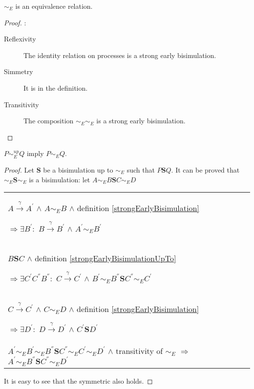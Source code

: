 \begin{proposition}
  $\sim_{E}$ is an equivalence relation.
  \begin{proof}:
    \begin{description}
      \item[Reflexivity]
	The identity relation on processes is a strong early bisimulation.
      \item[Simmetry]
	It is in the definition.
      \item[Transitivity]
	The composition $\sim_{E} \sim_{E}$ is a strong early bisimulation.
    \end{description}
  \end{proof}
\end{proposition}

\begin{proposition}\label{earlyBisimilarityUpToImplyEarlyBisimilarity}
  $P \sim_{E}^{up} Q$ imply $P \sim_{E} Q$.
  \begin{proof}
    Let $\mathbf{S}$ be a bisimulation up to $\sim_{E}$ such that $P \mathbf{S} Q$. It can be proved that $\sim_{E} \mathbf{S} \sim_{E}$ is a bisimulation: let $A \sim_{E} B \mathbf{S} C \sim_{E} D$
    \begin{center}
      \begin{tabular}{l}
	$A \xrightarrow{\gamma} A^{'}$ $\wedge$ $A \sim_{E} B$ $\wedge$ definition \ref{strongEarlyBisimulation} 
      
	$\Rightarrow \exists B^{'}:$ $B \xrightarrow{\gamma} B^{'}$ $\wedge$ $A^{'}\sim_{E} B^{'}$
      \\
	$B \mathbf{S} C$ $\wedge$ definition \ref{strongEarlyBisimulationUpTo}
      
	$\Rightarrow \exists C^{'} C^{''} B^{''}:$ $C \xrightarrow{\gamma} C^{'}$ $\wedge$ $B^{'} \sim_{E} B^{''} \mathbf{S} C^{''} \sim_{E} C^{'}$
      \\
	$C \xrightarrow{\gamma} C^{'}$ $\wedge$ $C \sim_{E} D$ $\wedge$ definition \ref{strongEarlyBisimulation} 
      
	$\Rightarrow \exists D^{'}:$ $D \xrightarrow{\gamma} D^{'}$ $\wedge$ $C^{'}\mathbf{S} D^{'}$
      \\
	$A^{'} \sim_{E} B^{'} \sim_{E} B^{''} \mathbf{S} C^{''} \sim_{E} C^{'} \sim_{E} D^{'}$ $\wedge$ transitivity of $\sim_{E}$
	$\Rightarrow$ $A^{'} \sim_{E} B^{''} \mathbf{S} C^{''} \sim_{E} D^{'}$
      \end{tabular}
    \end{center}
    It is easy to see that the symmetric also holds.
  \end{proof}
\end{proposition}

